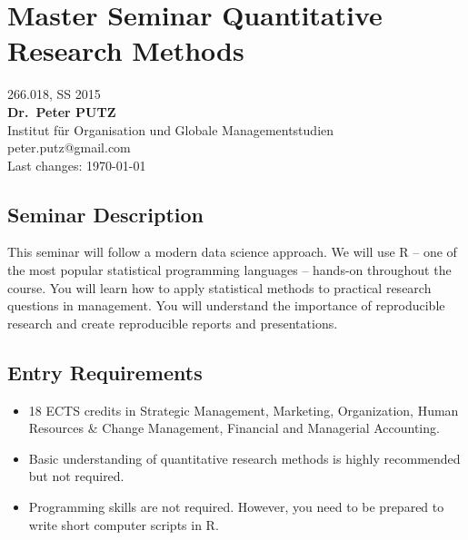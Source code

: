 \documentclass[]{article}
\date{}
\begin{document}

\centering

\section{Master Seminar Quantitative Research
Methods}\label{master-seminar-quantitative-research-methods}

266.018, SS 2015\\\textbf{Dr.~Peter PUTZ}\\Institut für Organisation und
Globale Managementstudien\\peter.putz@gmail.com\\Last changes: \today

\raggedright

\subsection{Seminar Description}\label{seminar-description}

This seminar will follow a modern data science approach. We will use R
-- one of the most popular statistical programming languages -- hands-on
throughout the course. You will learn how to apply statistical methods
to practical research questions in management. You will understand the
importance of reproducible research and create reproducible reports and
presentations.

\subsection{Entry Requirements}\label{entry-requirements}

\begin{itemize}
\itemsep1pt\parskip0pt
\item
  18 ECTS credits in Strategic Management, Marketing, Organization,
  Human Resources \& Change Management, Financial and Managerial
  Accounting.
\item
  Basic understanding of quantitative research methods is highly
  recommended but not required.
\item
  Programming skills are not required. However, you need to be prepared
  to write short computer scripts in R.
\end{itemize}
\end{document}
